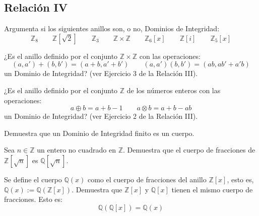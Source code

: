 \subsection{Relación IV}

\begin{ejercicio}
    Argumenta si los siguientes anillos son, o no, Dominios de Integridad:
    \begin{equation*}
        \mathbb{Z}_8 \qquad \mathbb{Z}\left[\sqrt{2}\right]\qquad \mathbb{Z}_3 \qquad \mathbb{Z}\times \mathbb{Z}\qquad \mathbb{Z}_6[x] \qquad \mathbb{Z}[i] \qquad \mathbb{Z}_5[x]
    \end{equation*}
\end{ejercicio}

\begin{ejercicio}
    ¿Es el anillo definido por el conjunto $\mathbb{Z}\times \mathbb{Z}$ con las operaciones:
    \begin{equation*}
        (a,a')+(b,b') = (a+b, a'+b')\qquad (a,a')(b,b') = (ab,ab'+a'b)
    \end{equation*}
    un Dominio de Integridad? (ver Ejercicio 3 de la Relación III).
\end{ejercicio}

\begin{ejercicio}
    ¿Es el anillo definido por el conjunto $\mathbb{Z}$ de los números enteros con las operaciones:
    \begin{equation*}
        a\oplus b = a+b-1 \qquad a\otimes b = a+b-ab
    \end{equation*}
    un Dominio de Integridad? (ver Ejercicio 2 de la Relación III).
\end{ejercicio}

\begin{ejercicio}
    Demuestra que un Dominio de Integridad finito es un cuerpo.
\end{ejercicio}

\begin{ejercicio}
    Sea $n\in \mathbb{Z}$ un entero no cuadrado en $\mathbb{Z}$. Demuestra que el cuerpo de fracciones de $\mathbb{Z}\left[\sqrt{n}\right]$ es $\mathbb{Q}\left[\sqrt{n}\right]$.
\end{ejercicio}

\begin{ejercicio}
    Se define el cuerpo $\mathbb{Q}(x)$ como el cuerpo de fracciones del anillo $\mathbb{Z}[x]$, esto es, $\mathbb{Q}(x) := \mathbb{Q}(\mathbb{Z}[x])$. Demuestra que $\mathbb{Z}[x]$ y $\mathbb{Q}[x]$ tienen el mismo cuerpo de fracciones. Esto es:
    \begin{equation*}
        \mathbb{Q}(\mathbb{Q}[x]) = \mathbb{Q}(x)
    \end{equation*}
\end{ejercicio}

